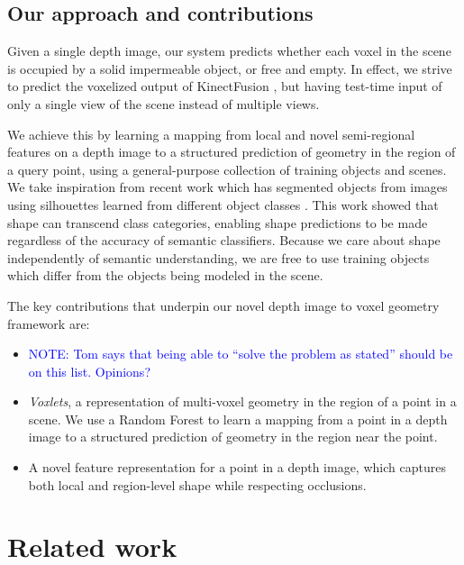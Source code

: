 \documentclass[10pt,twocolumn,letterpaper]{article}
\newcommand{\note}[1]{\textcolor{blue}{NOTE: #1}}
\begin{document}
\subsection{Our approach and contributions}

Given a single depth image, our system predicts whether each voxel in the scene is occupied by a solid impermeable object, or free and empty.
In effect, we strive to predict the voxelized output of KinectFusion \cite{izadi-uist-2011}, but having test-time input of only a single view of the scene instead of multiple views.

We achieve this by learning a mapping from local and novel semi-regional features on a depth image to a structured prediction of geometry in the region of a query point, using a general-purpose collection of training objects and scenes.
We take inspiration from recent work which has segmented objects from images using silhouettes learned from different object classes \cite{kim-eccv-2012}.
This work showed that shape can transcend class categories, enabling shape predictions to be made regardless of the accuracy of semantic classifiers.
Because we care about shape independently of semantic understanding, we are free to use training objects which differ from the objects being modeled in the scene.

The key contributions that underpin our novel depth image to voxel geometry framework are:
\begin{itemize}
\item \note{Tom says that being able to ``solve the problem as stated'' should be on this list. Opinions?}
\item \emph{Voxlets}, a representation of multi-voxel geometry in the region of a point in a scene. 
We use a Random Forest to learn a mapping from a point in a depth image to a structured prediction of geometry in the region near the point.
\item A novel feature representation for a point in a depth image, which captures both local and region-level shape while respecting occlusions.
\end{itemize}


\section{Related work}
\end{document}
